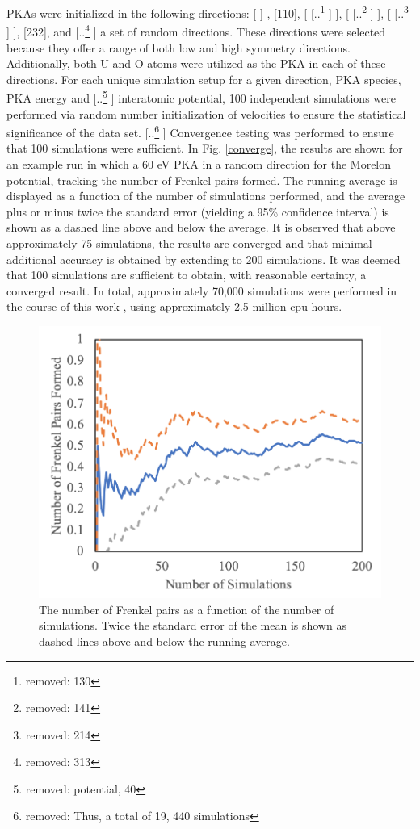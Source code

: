 \documentclass[review]{elsarticle} %
\providecommand{\DIFaddtex}[1]{{\protect\color{blue} \sf #1}} %
\providecommand{\DIFdeltex}[1]{{\protect\color{red} [..\footnote{removed: #1} ]}} %
\providecommand{\DIFaddbegin}{} %
\providecommand{\DIFaddend}{} %
\providecommand{\DIFdelbegin}{} %
\providecommand{\DIFdelend}{} %
\providecommand{\DIFaddFL}[1]{\DIFadd{#1}} %
\providecommand{\DIFadd}[1]{\texorpdfstring{\DIFaddtex{#1}}{#1}} %
\providecommand{\DIFdel}[1]{\texorpdfstring{\DIFdeltex{#1}}{}} %
\newcommand{\DIFscaledelfig}{0.5}
\newlength{\DIFdelgraphicswidth} %
\newlength{\DIFdelgraphicsheight} %
\newcommand{\DIFaddincludegraphics}[2][]{{\color{blue}\fbox{\DIFOincludegraphics[#1]{#2}}}} %
\newcommand{\DIFdelincludegraphics}[2][]{%
\sbox{\DIFdelgraphicsbox}{\DIFOincludegraphics[#1]{#2}}%
\settoboxwidth{\DIFdelgraphicswidth}{\DIFdelgraphicsbox} %
\settoboxtotalheight{\DIFdelgraphicsheight}{\DIFdelgraphicsbox} %
\scalebox{\DIFscaledelfig}{%
\parbox[b]{\DIFdelgraphicswidth}{\usebox{\DIFdelgraphicsbox}\\[-\baselineskip] \rule{\DIFdelgraphicswidth}{0em}}\llap{\resizebox{\DIFdelgraphicswidth}{\DIFdelgraphicsheight}{%
\setlength{\unitlength}{\DIFdelgraphicswidth}%
\begin{picture}(1,1)%
\thicklines\linethickness{2pt} %
{\color[rgb]{1,0,0}\put(0,0){\framebox(1,1){}}}%
{\color[rgb]{1,0,0}\put(0,0){\line( 1,1){1}}}%
{\color[rgb]{1,0,0}\put(0,1){\line(1,-1){1}}}%
\end{picture}%
}\hspace*{3pt}}} %
} %
\DeclareRobustCommand{\DIFaddbegin}{\DIFOaddbegin \let\includegraphics\DIFaddincludegraphics} %
\DeclareRobustCommand{\DIFaddend}{\DIFOaddend \let\includegraphics\DIFOincludegraphics} %
\DeclareRobustCommand{\DIFdelbegin}{\DIFOdelbegin \let\includegraphics\DIFdelincludegraphics} %
\DeclareRobustCommand{\DIFdelend}{\DIFOaddend \let\includegraphics\DIFOincludegraphics} %
\begin{document}
PKAs were initialized in the following directions: [\DIFaddbegin \DIFadd{100}]\DIFadd{, }[\DIFaddend 110], [\DIFdelbegin \DIFdel{130}\DIFdelend \DIFaddbegin \DIFadd{111}\DIFaddend ], [\DIFdelbegin \DIFdel{141}\DIFdelend \DIFaddbegin \DIFadd{130}\DIFaddend ], [\DIFdelbegin \DIFdel{214}\DIFdelend \DIFaddbegin \DIFadd{141}\DIFaddend ], [232], and \DIFdelbegin %
\DIFdel{313}%
\DIFdelend \DIFaddbegin \DIFadd{a set of random directions}\DIFaddend . These directions were selected because they offer a range of both low and high symmetry directions. Additionally, both U and O atoms were utilized as the PKA in each of these directions. For each unique simulation setup for a given direction, PKA species, PKA energy and \DIFdelbegin \DIFdel{potential, 40 }\DIFdelend \DIFaddbegin \DIFadd{interatomic potential, 100 }\DIFaddend independent simulations were performed via random number initialization of velocities to ensure the statistical significance of the data set. \DIFdelbegin \DIFdel{Thus, a total of 19, 440 simulations}\DIFdelend \DIFaddbegin \DIFadd{Convergence testing was performed to ensure that 100 simulations were sufficient. In Fig. \ref{converge}, the results are shown for an example run in which a 60 eV PKA in a random direction for the Morelon potential, tracking the number of Frenkel pairs formed. The running average is displayed as a function of the number of simulations performed, and the average plus or minus twice the standard error (yielding a 95\% confidence interval) is shown as a dashed line above and below the average. It is observed that above approximately 75 simulations, the results are converged and that minimal additional accuracy is obtained by extending to 200 simulations. It was deemed that 100 simulations are sufficient to obtain, with reasonable certainty, a converged result. In total, approximately 70,000 simulations }\DIFaddend were performed in the course of this work\DIFaddbegin \DIFadd{, using approximately 2.5 million cpu-hours}\DIFaddend .

\DIFaddbegin \begin{figure}[h]
\centering
	\includegraphics[width=0.6\linewidth]{converge.png}
	\caption{\DIFaddFL{The number of Frenkel pairs as a function of the number of simulations. Twice the standard error of the mean is shown as dashed lines above and below the running average.}}
	\label{fig:converge}
\end{figure}
\end{document}
